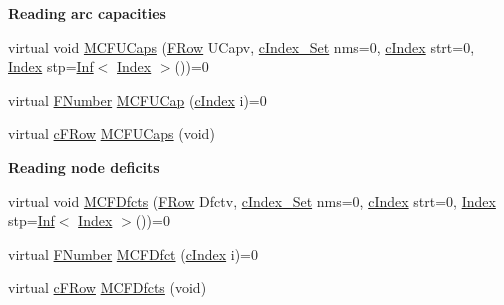 \begin{Indent}\textbf{ Reading arc capacities}\par
\begin{DoxyCompactItemize}
\item 
virtual void \mbox{\hyperlink{class_m_c_f_class_a999b9738aa5cb925c5b4a799ed6d4838}{M\+C\+F\+U\+Caps}} (\mbox{\hyperlink{class_m_c_f_class_a9dae1f1a39c208ce3c2b337cd5bb3d00}{F\+Row}} U\+Capv, \mbox{\hyperlink{class_m_c_f_class_a81575b2d4e4d5636b17170432150ae69}{c\+Index\+\_\+\+Set}} nms=0, \mbox{\hyperlink{class_m_c_f_class_a76aaabb20535c51a2752b93f6c38fe54}{c\+Index}} strt=0, \mbox{\hyperlink{class_m_c_f_class_ad53d6229d7ec28555a9c9c2fd9abf773}{Index}} stp=\mbox{\hyperlink{class_o_p_ttypes__di__unipi__it_1_1_inf}{Inf}}$<$ \mbox{\hyperlink{class_m_c_f_class_ad53d6229d7ec28555a9c9c2fd9abf773}{Index}} $>$())=0
\item 
virtual \mbox{\hyperlink{class_m_c_f_class_aeea3e5951d222b2a8e57de1b4246a909}{F\+Number}} \mbox{\hyperlink{class_m_c_f_class_a3af18f0859dd6ddea9d29ed39c9b27a3}{M\+C\+F\+U\+Cap}} (\mbox{\hyperlink{class_m_c_f_class_a76aaabb20535c51a2752b93f6c38fe54}{c\+Index}} i)=0
\item 
virtual \mbox{\hyperlink{class_m_c_f_class_ad325f3193dbba0ddef1da4e72d29eda6}{c\+F\+Row}} \mbox{\hyperlink{class_m_c_f_class_aae54f2f08242d5fd631eb613d82e4d1c}{M\+C\+F\+U\+Caps}} (void)
\end{DoxyCompactItemize}
\end{Indent}
\begin{Indent}\textbf{ Reading node deficits}\par
\begin{DoxyCompactItemize}
\item 
virtual void \mbox{\hyperlink{class_m_c_f_class_a99e2d376efc0d9552a62f9b71512b563}{M\+C\+F\+Dfcts}} (\mbox{\hyperlink{class_m_c_f_class_a9dae1f1a39c208ce3c2b337cd5bb3d00}{F\+Row}} Dfctv, \mbox{\hyperlink{class_m_c_f_class_a81575b2d4e4d5636b17170432150ae69}{c\+Index\+\_\+\+Set}} nms=0, \mbox{\hyperlink{class_m_c_f_class_a76aaabb20535c51a2752b93f6c38fe54}{c\+Index}} strt=0, \mbox{\hyperlink{class_m_c_f_class_ad53d6229d7ec28555a9c9c2fd9abf773}{Index}} stp=\mbox{\hyperlink{class_o_p_ttypes__di__unipi__it_1_1_inf}{Inf}}$<$ \mbox{\hyperlink{class_m_c_f_class_ad53d6229d7ec28555a9c9c2fd9abf773}{Index}} $>$())=0
\item 
virtual \mbox{\hyperlink{class_m_c_f_class_aeea3e5951d222b2a8e57de1b4246a909}{F\+Number}} \mbox{\hyperlink{class_m_c_f_class_a81e07cb46404db5a9fd83075a0908208}{M\+C\+F\+Dfct}} (\mbox{\hyperlink{class_m_c_f_class_a76aaabb20535c51a2752b93f6c38fe54}{c\+Index}} i)=0
\item 
virtual \mbox{\hyperlink{class_m_c_f_class_ad325f3193dbba0ddef1da4e72d29eda6}{c\+F\+Row}} \mbox{\hyperlink{class_m_c_f_class_ad7e8d115e0f2bd90e1b65a573cb46ae4}{M\+C\+F\+Dfcts}} (void)
\end{DoxyCompactItemize}
\end{Indent}
